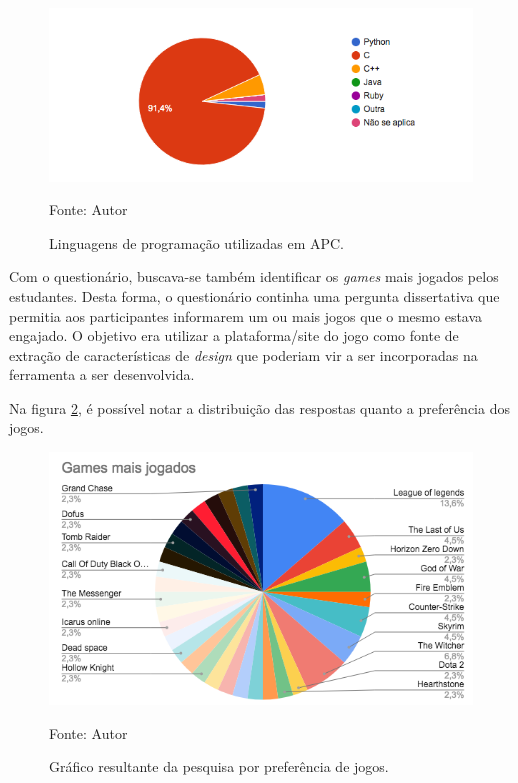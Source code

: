 \begin{figure}[h]
	\centering
	\includegraphics[keepaspectratio=true,scale=0.75]{figuras/linguagemc.png}
	\caption{Linguagens de programação utilizadas em APC.}
	Fonte: {Autor}
	\label{linguagemc}
\end{figure}

Com o questionário, buscava-se também identificar os \textit{games} mais jogados pelos estudantes. Desta forma, o questionário continha uma
pergunta dissertativa que permitia aos participantes informarem um ou mais jogos que o mesmo estava engajado. O objetivo era utilizar 
a plataforma/site do jogo como fonte de extração de características de \textit{design} que poderiam vir a ser incorporadas na ferramenta a ser
desenvolvida.

Na figura \ref{gamejogados}, é possível notar a distribuição das respostas quanto a preferência dos jogos.

\pagebreak

\begin{figure}[h]
	\centering
	\includegraphics[keepaspectratio=true,scale=0.75]{figuras/gamejogados.png}
	\caption{Gráfico resultante da pesquisa por preferência de jogos.}
	Fonte: {Autor}
	\label{gamejogados}
\end{figure}

